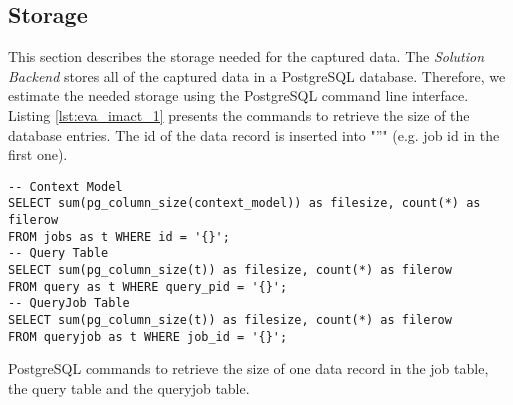 \documentclass[draft,final]{vutinfth} %
\begin{document}

\subsection*{Storage}\label{Evaluation:impact_stor}

This section describes the storage needed for the captured data. The \textit{Solution Backend} stores all of the captured data in a PostgreSQL database. Therefore, we estimate the needed storage using the PostgreSQL command line interface. Listing \ref{lst:eva_imact_1} presents the commands to retrieve the size of the database entries. The id of the data record is inserted into "''" (e.g. job id in the first one).  

\begin{listing}[ht]
	\begin{verbatim}
-- Context Model 
SELECT sum(pg_column_size(context_model)) as filesize, count(*) as filerow 
FROM jobs as t WHERE id = '{}';
-- Query Table
SELECT sum(pg_column_size(t)) as filesize, count(*) as filerow 
FROM query as t WHERE query_pid = '{}';
-- QueryJob Table
SELECT sum(pg_column_size(t)) as filesize, count(*) as filerow 
FROM queryjob as t WHERE job_id = '{}';
	\end{verbatim}
	\caption{PostgreSQL commands to retrieve the size of one data record in the job table, the query table and the queryjob table.}
	\label{lst:eva_imact_1}
\end{listing}	

\end{document}
